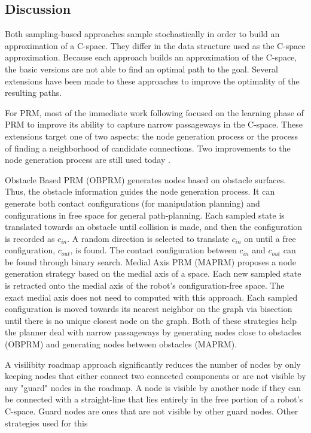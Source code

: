 \documentclass[10pt,conference]{ieeeconf}
\begin{document}
\subsection{Discussion}

Both sampling-based approaches sample stochastically in order to build an approximation of a C-space. They differ in the data structure used as the C-space approximation. Because each approach builds an approximation of the C-space, the basic versions are not able to find an optimal path to the goal. Several extensions have been made to these approaches to improve the optimality of the resulting paths.

For PRM, most of the immediate work following \cite{PRM} focused on the learning phase of PRM to improve its ability to capture narrow passageways in the C-space. These extensions target one of two aspects: the node generation process or the process of finding a neighborhood of candidate connections. Two improvements to the node generation process are still used today \cite{amato1998obprm,wilmarth1999maprm}. 


Obstacle Based PRM (OBPRM) \cite{amato1998obprm} generates nodes based on obstacle surfaces. Thus, the obstacle information guides the node generation process. It can generate both contact configurations (for manipulation planning) and configurations in free space for general path-planning. Each sampled state is translated towards an obstacle until collision is made, and then the configuration is recorded as $c_{in}$. A random direction is selected to translate $c_{in}$ on until a free configuration, $c_{out}$, is found. The contact configuration between $c_{in}$ and $c_{out}$ can be found through binary search.
Medial Axis PRM (MAPRM) \cite{wilmarth1999maprm} proposes a node generation strategy based on the medial axis of a space. Each new sampled state is retracted onto the medial axis of the robot's configuration-free space. The exact medial axis does not need to computed with this approach. Each sampled configuration is moved towards its nearest neighbor on the graph via bisection until there is no unique closest node on the graph. Both of these strategies help the planner deal with narrow passageways by generating nodes close to obstacles (OBPRM) and generating nodes between obstacles (MAPRM).

A visilibity roadmap approach \cite{nissoux1999visibility} significantly reduces the number of nodes by only keeping nodes that either connect two connected components or are not visible by any "guard" nodes in the roadmap. A node is visible by another node if they can be connected with a straight-line that lies entirely in the free portion of a robot's C-space. Guard nodes are ones that are not visible by other guard nodes. Other strategies used for this 
\end{document}
